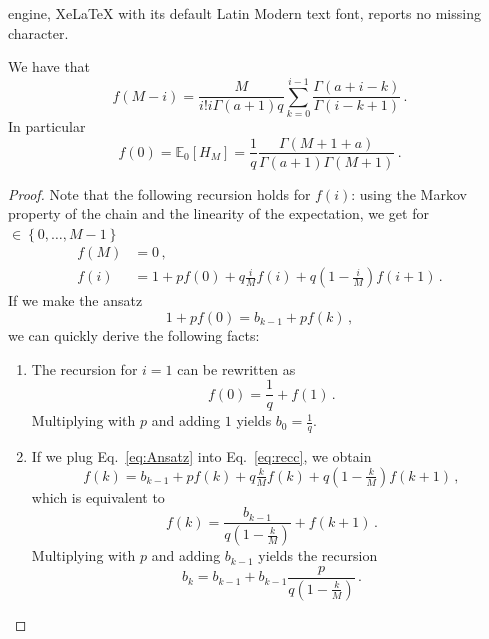 \documentclass[10pt,a4paper]{amsart}
\newcommand{\E}     {\mathbb{E}}
\newcommand{\gk}[1]{\left\{#1\right\}}
\newcommand{\rk}[1]{\left(#1\right)}
\begin{document}
engine, XeLaTeX with its default Latin Modern text font, reports no missing character.
\begin{lemma}
    We have that
    \begin{equation}
        f(M-i)=\frac{M}{i!i\Gamma(a+1)q}\sum_{k=0}^{i-1}\frac{\Gamma(a+i-k)}{\Gamma(i-k+1)}\, .
    \end{equation}
    In particular
    \begin{equation}\label{eq:313251}
       f(0)=\E_0[H_M]=\frac{1}{q}\frac{\Gamma\rk{M+1+a}}{\Gamma(a+1)\Gamma(M+1)}\, .
    \end{equation}
\end{lemma}

\begin{proof}
Note that the following recursion holds for $f(i)$: using the Markov property of the chain and the linearity of the expectation, we get for $\in \gk{0,\ldots, M-1}$
    \begin{equation}\label{eq:recc}
\begin{split}
    f(M)&=0\, ,\\
    f(i)&=1+pf(0)+q\tfrac{i}{M}f(i)+q\rk{1-\tfrac{i}{M}}f(i+1)\, .
\end{split}
\end{equation}
If we make the ansatz
\begin{equation}\label{eq:Ansatz}
    1+pf(0)=b_{k-1}+pf(k)\, ,
\end{equation}
we can quickly derive the following facts:
\begin{enumerate}
    \item The recursion for $i=1$ can be rewritten as 
    \begin{equation}
        f(0)=\frac{1}{q}+f(1)\, .
    \end{equation}
    Multiplying with $p$ and adding $1$ yields $b_0=\frac{1}{q}$.
    \item If we plug Eq.~\eqref{eq:Ansatz} into Eq.~\eqref{eq:recc}, we obtain
    \begin{equation}
        f(k)=b_{k-1}+pf(k)+q\tfrac{k}{M}f(k)+q\rk{1-\tfrac{k}{M}}f(k+1)\, ,
    \end{equation}
    which is equivalent to
    \begin{equation}
        f(k)=\frac{b_{k-1}}{q\rk{1-\tfrac{k}{M}}}+f(k+1)\, .
    \end{equation}
    Multiplying with $p$ and adding $b_{k-1}$ yields the recursion
    \begin{equation}\label{eq:recbk}
        b_{k}=b_{k-1}+b_{k-1}\frac{p}{q\rk{1-\tfrac{k}{M}}}\, .

\end{equation}
\end{enumerate}
\end{proof}
\end{document}
